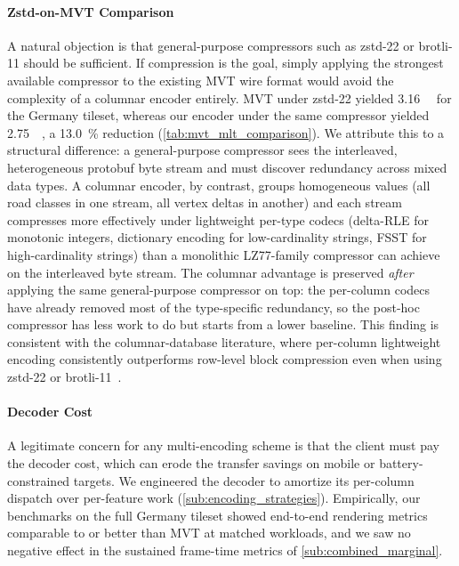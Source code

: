 \paragraph{Zstd-on-\acs{MVT} Comparison}
A natural objection is that general-purpose compressors such as zstd-22 or brotli-11 should be sufficient. If compression is the goal, simply applying the strongest available compressor to the existing \ac{MVT} wire format would avoid the complexity of a columnar encoder entirely.
\ac{MVT} under zstd-22 yielded \qty{3.16}{\giga\byte} for the Germany tileset, whereas our encoder under the same compressor yielded \qty{2.75}{\giga\byte}, a \qty{13.0}{\percent} reduction (\cref{tab:mvt_mlt_comparison}).
We attribute this to a structural difference: a general-purpose compressor sees the interleaved, heterogeneous protobuf byte stream and must discover redundancy across mixed data types.
A columnar encoder, by contrast, groups homogeneous values (all road classes in one stream, all vertex deltas in another) and each stream compresses more effectively under lightweight per-type codecs (delta-\acs{RLE} for monotonic integers, dictionary encoding for low-cardinality strings, \ac{FSST} for high-cardinality strings) than a monolithic LZ77-family compressor can achieve on the interleaved byte stream.
The columnar advantage is preserved \emph{after} applying the same general-purpose compressor on top: the per-column codecs have already removed most of the type-specific redundancy, so the post-hoc compressor has less work to do but starts from a lower baseline.
This finding is consistent with the columnar-database literature, where per-column lightweight encoding consistently outperforms row-level block compression even when using zstd-22 or brotli-11~\cite{kuschewskiBtrBlocksEfficientColumnar2023}.

\paragraph{Decoder Cost}
A legitimate concern for any multi-encoding scheme is that the client must pay the decoder cost, which can erode the transfer savings on mobile or battery-constrained targets.
We engineered the decoder to amortize its per-column dispatch over per-feature work (\cref{sub:encoding_strategies}).
Empirically, our benchmarks on the full Germany tileset showed end-to-end rendering metrics comparable to or better than \ac{MVT} at matched workloads, and we saw no negative effect in the sustained frame-time metrics of \cref{sub:combined_marginal}.


